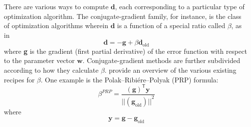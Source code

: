 There are various ways to compute $\textbf{d}$, each corresponding to a 
particular type of optimization algorithm. The conjugate-gradient family, 
for instance, is the class of optimization algorithms wherein $\textbf{d}$ is a function 
of a special ratio called $\beta$, as in
\begin{equation}\label{eq:basic-d}
\textbf{d}= -\textbf{g}  + \beta \textbf{d}_{\text{old}} 
\end{equation}
where \textbf{g} is the gradient (first partial derivative) of the error function with respect 
to the parameter vector $\textbf{w}$. 
Conjugate-gradient methods are further subdivided according to how they calculate $\beta$.
\citet{hager:2006} provide an overview of the various existing recipes for $\beta$.
One example is the Polak--Ribi\'{e}re--Polyak (PRP) formula:
\begin{equation}\label{eq:PRP}
\beta^{PRP} = \frac{(\textbf{g})^{\textsf{T}}{\textbf{y}}}{{||(\textbf{g}_{\text{old}})||}^2}
\end{equation}
where
\begin{equation}\label{eq:y}
\textbf{y} = \textbf{g} - \textbf{g}_{\text{old}} 
\end{equation}

